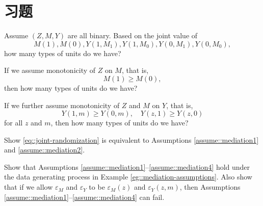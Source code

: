 \par{}

\section{习题}\label{sec:27-homework}

\begin{HomeworkProblem}\label{exr:27-1}


Assume $(Z, M, Y)$ are all binary. Based on the joint value of
\[
M(1), M(0),  Y(1, M_1), Y(1, M_0), Y(0, M_1), Y(0, M_0) ,
\]
how many types of units do we have?

If we assume monotonicity of $Z$ on $M$, that is,
\[
M(1) \geq  M(0),
\]
then how many types of units do we have?

If we further assume monotonicity of $Z$ and $M$ on $Y$, that is,
\[
Y(1, m) \geq Y(0, m),  \quad Y(z, 1) \geq Y(z, 0)
\]
for all $z$ and $m$, then how many types of units do we have?


\end{HomeworkProblem}

\begin{HomeworkProblem}\label{exr:27-2}

Show \eqref{eq::joint-randomization} is equivalent to Assumptions \ref{assume::mediation1} and \ref{assume::mediation2}.


\end{HomeworkProblem}

\begin{HomeworkProblem}\label{exr:27-3}

Show that Assumptions \ref{assume::mediation1}--\ref{assume::mediation4} hold under the data generating process in Example \ref{eg::mediation-assumptions}.
Also show that if we allow $  \varepsilon_M$ and $\varepsilon_Y$ to be $ \varepsilon_M(z)$ and $\varepsilon_Y(z,m)$, then Assumptions \ref{assume::mediation1}--\ref{assume::mediation4} can fail.

\end{HomeworkProblem}

